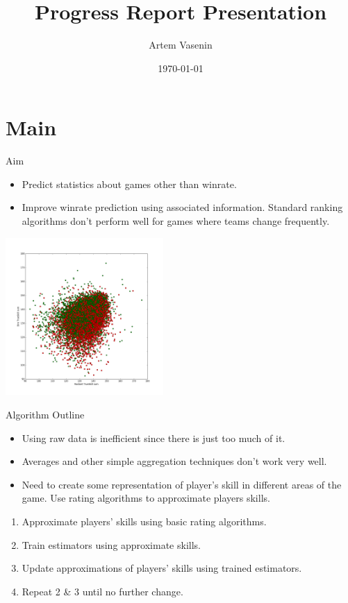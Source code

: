 \documentclass{beamer}
\title[Progress Report]{Progress Report Presentation}
\author{Artem Vasenin}
\institute{Predicting arbitrary events in competitive computer team games}
\date{\today}
\begin{document}
\begin{frame}
  \titlepage
\end{frame}



\section{Main}

\begin{frame}{Aim}

\begin{itemize}
  \item Predict statistics about games other than winrate.
  \item Improve winrate prediction using associated information. Standard ranking algorithms don't perform well for games where teams change frequently.
\end{itemize}
\begin{center}
\includegraphics[width=6cm]{winrate}
\end{center}


\end{frame}

\begin{frame}{Algorithm Outline}
\begin{itemize}
\item Using raw data is inefficient since there is just too much of it.
\item Averages and other simple aggregation techniques don't work very well.
\item Need to create some representation of player's skill in different areas of the game. 
Use rating algorithms to approximate players skills.
\end{itemize}

\begin{enumerate}
\item Approximate players' skills using basic rating algorithms.
\item Train estimators using approximate skills.
\item Update approximations of players' skills using trained estimators.
\item Repeat 2 \& 3 until no further change.
\end{enumerate}

\end{frame}
\end{document}
